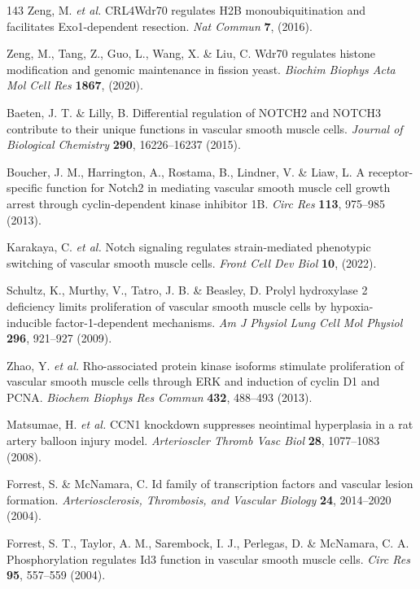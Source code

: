 \documentclass[12pt]{article}
\begin{document}
\begin{thebibliography}{143}
 Zeng, M. \textit{et al.} CRL4Wdr70 regulates H2B monoubiquitination and facilitates Exo1-dependent resection. \textit{Nat Commun} \textbf{7}, (2016).

 Zeng, M., Tang, Z., Guo, L., Wang, X. \& Liu, C. Wdr70 regulates histone modification and genomic maintenance in fission yeast. \textit{Biochim Biophys Acta Mol Cell Res} \textbf{1867}, (2020).

 Baeten, J. T. \& Lilly, B. Differential regulation of NOTCH2 and NOTCH3 contribute to their unique functions in vascular smooth muscle cells. \textit{Journal of Biological Chemistry} \textbf{290}, 16226--16237 (2015).

 Boucher, J. M., Harrington, A., Rostama, B., Lindner, V. \& Liaw, L. A receptor-specific function for Notch2 in mediating vascular smooth muscle cell growth arrest through cyclin-dependent kinase inhibitor 1B. \textit{Circ Res} \textbf{113}, 975--985 (2013).

 Karakaya, C. \textit{et al.} Notch signaling regulates strain-mediated phenotypic switching of vascular smooth muscle cells. \textit{Front Cell Dev Biol} \textbf{10}, (2022).

 Schultz, K., Murthy, V., Tatro, J. B. \& Beasley, D. Prolyl hydroxylase 2 deficiency limits proliferation of vascular smooth muscle cells by hypoxia-inducible factor-1-dependent mechanisms. \textit{Am J Physiol Lung Cell Mol Physiol} \textbf{296}, 921--927 (2009).

 Zhao, Y. \textit{et al.} Rho-associated protein kinase isoforms stimulate proliferation of vascular smooth muscle cells through ERK and induction of cyclin D1 and PCNA. \textit{Biochem Biophys Res Commun} \textbf{432}, 488--493 (2013).

 Matsumae, H. \textit{et al.} CCN1 knockdown suppresses neointimal hyperplasia in a rat artery balloon injury model. \textit{Arterioscler Thromb Vasc Biol} \textbf{28}, 1077--1083 (2008).

 Forrest, S. \& McNamara, C. Id family of transcription factors and vascular lesion formation. \textit{Arteriosclerosis, Thrombosis, and Vascular Biology} \textbf{24}, 2014--2020 (2004).

 Forrest, S. T., Taylor, A. M., Sarembock, I. J., Perlegas, D. \& McNamara, C. A. Phosphorylation regulates Id3 function in vascular smooth muscle cells. \textit{Circ Res} \textbf{95}, 557--559 (2004).


\end{thebibliography}
\end{document}
